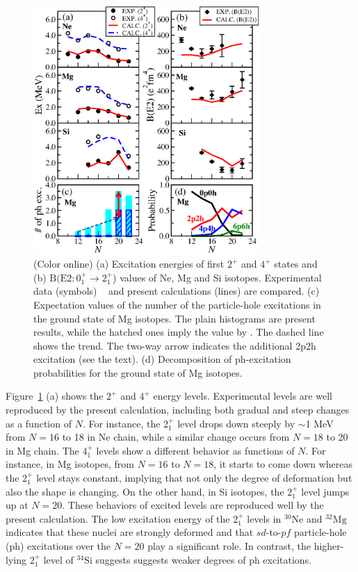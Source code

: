 \documentclass[aps,prl,twocolumn,groupedaddress,showkeys,showpacs,floatfix,superscriptaddress]{revtex4-1}
\def\Nu#1#2#3{{}^{#2}_{#3}\mathrm{#1}}
\newcommand\+{^\dagger}
\begin{document}
\begin{figure}[tbp]
 \includegraphics[width=8.5725cm,angle=0,clip]{Fig2.eps}
 \caption{(Color online)
 (a) Excitation energies of first $2^{+}$
  and $4^{+}$ states and (b) $\mathrm{B(E2}: 0_1^{+}\rightarrow 2_1^{+}$) values 
  of Ne, Mg and Si isotopes.
 Experimental data (symbols) ~\cite{NationalNuclearDataCenter:2008tv,Takeuchi:2012ch} 
 and present calculations (lines) are compared.
 (c) Expectation values of the number of the particle-hole excitations in the ground state of Mg isotopes.
   The plain histograms are present results, while the hatched ones imply the value 
   by \cite{Warburton:1990vw}.  The dashed line shows the trend.
   The two-way arrow indicates the additional 2p2h excitation (see the text).  
   (d) Decomposition of ph-excitation probabilities for the ground state of Mg isotopes. }
  \label{fig:E2_BE2}
\end{figure}

Figure~\ref{fig:E2_BE2} (a) shows the $2^{+}$ and $4^{+}$ energy levels.
Experimental levels are well reproduced by the present calculation, including 
both gradual and steep changes as a function of $N$. 
For instance, the 2$^+_1$ level drops down steeply
by $\sim$1 MeV from $N=16$ to 18 in Ne chain, while a similar 
change occurs from $N=18$ to 20 in Mg chain.  
The $4^{+}_1$ levels show a different behavior as functions of $N$.
For instance, in Mg isotopes, from $N=16$ to $N=18$, it starts to come down whereas
the $2^{+}_1$ level stays constant, implying that 
not only the degree of deformation but also the shape is changing.
On the other hand, in Si isotopes, the 2$^+_1$ level jumps up at $N=20$.  
These behaviors of excited levels are reproduced well 
by the present calculation.  
The low excitation energy of the $2^{+}_1$ levels in $\Nu{Ne}{30}{}$ and 
$\Nu{Mg}{32}{}$ indicates that these nuclei are strongly deformed and that 
$sd$-to-$pf$ particle-hole (ph) excitations over the $N=20$ play a significant role.  
In contrast, the higher-lying $2^{+}_1$ level of $\Nu{Si}{34}{}$
suggests suggests weaker degrees of ph excitations.   
\end{document}
